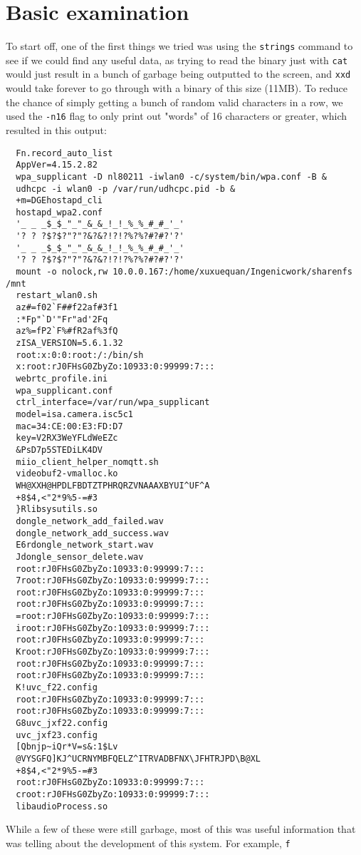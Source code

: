 \documentclass[a4paper, 11pt]{article}
\begin{document}
\section{Basic examination}
To start off, one of the first things we tried was using the \verb|strings| command to see if we could find any useful data, as trying to read the binary just with \verb|cat| would just result in a bunch of garbage being outputted to the screen, and \verb|xxd| would take forever to go through with a binary of this size (11MB). To reduce the chance of simply getting a bunch of random valid characters in a row, we used the \verb|-n16| flag to only print out "words" of 16 characters or greater, which resulted in this output:
\begin{verbatim}
  Fn.record_auto_list
  AppVer=4.15.2.82
  wpa_supplicant -D nl80211 -iwlan0 -c/system/bin/wpa.conf -B &
  udhcpc -i wlan0 -p /var/run/udhcpc.pid -b &
  +m=DGEhostapd_cli
  hostapd_wpa2.conf
  '_ _ _$_$_"_"_&_&_!_!_%_%_#_#_'_'
  '? ? ?$?$?"?"?&?&?!?!?%?%?#?#?'?'
  '_ _ _$_$_"_"_&_&_!_!_%_%_#_#_'_'
  '? ? ?$?$?"?"?&?&?!?!?%?%?#?#?'?'
  mount -o nolock,rw 10.0.0.167:/home/xuxuequan/Ingenicwork/sharenfs /mnt
  restart_wlan0.sh
  az#=f02`F##f22af#3f1
  :*Fp"`D'"Fr"ad'2Fq
  az%=fP2`F%#fR2af%3fQ
  zISA_VERSION=5.6.1.32
  root:x:0:0:root:/:/bin/sh
  x:root:rJ0FHsG0ZbyZo:10933:0:99999:7:::
  webrtc_profile.ini
  wpa_supplicant.conf
  ctrl_interface=/var/run/wpa_supplicant
  model=isa.camera.isc5c1
  mac=34:CE:00:E3:FD:D7
  key=V2RX3WeYFLdWeEZc
  &PsD7p5STEDiLK4DV
  miio_client_helper_nomqtt.sh
  videobuf2-vmalloc.ko
  WH@XXH@HPDLFBDTZTPHRQRZVNAAAXBYUI^UF^A
  +8$4,<"2*9%5-=#3
  }Rlibsysutils.so
  dongle_network_add_failed.wav
  dongle_network_add_success.wav
  E6rdongle_network_start.wav
  Jdongle_sensor_delete.wav
  root:rJ0FHsG0ZbyZo:10933:0:99999:7:::
  7root:rJ0FHsG0ZbyZo:10933:0:99999:7:::
  root:rJ0FHsG0ZbyZo:10933:0:99999:7:::
  root:rJ0FHsG0ZbyZo:10933:0:99999:7:::
  =root:rJ0FHsG0ZbyZo:10933:0:99999:7:::
  iroot:rJ0FHsG0ZbyZo:10933:0:99999:7:::
  root:rJ0FHsG0ZbyZo:10933:0:99999:7:::
  Kroot:rJ0FHsG0ZbyZo:10933:0:99999:7:::
  root:rJ0FHsG0ZbyZo:10933:0:99999:7:::
  root:rJ0FHsG0ZbyZo:10933:0:99999:7:::
  K!uvc_f22.config
  root:rJ0FHsG0ZbyZo:10933:0:99999:7:::
  root:rJ0FHsG0ZbyZo:10933:0:99999:7:::
  G8uvc_jxf22.config
  uvc_jxf23.config
  [Qbnjp~iQr*V=s&:1$Lv
  @VYSGFQ]KJ^UCRNYMBFQELZ^ITRVADBFNX\JFHTRJPD\B@XL
  +8$4,<"2*9%5-=#3
  root:rJ0FHsG0ZbyZo:10933:0:99999:7:::
  croot:rJ0FHsG0ZbyZo:10933:0:99999:7:::
  libaudioProcess.so
\end{verbatim}
While a few of these were still garbage, most of this was useful information that was telling about the development of this system. For example, \verb|f|
\end{document}
